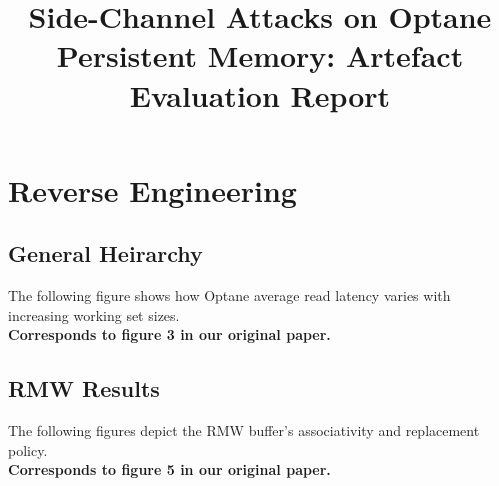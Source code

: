 \documentclass[letterpaper,twocolumn,10pt]{article}
\begin{document}
\title{Side-Channel Attacks on Optane Persistent Memory: Artefact Evaluation Report}

\maketitle

\newcommand{\corresponds}[1]{\textbf{\\Corresponds to #1  in our original paper.}}

\section{Reverse Engineering}
\subsection{General Heirarchy}
The following figure shows how Optane average read latency varies with increasing working set sizes.
\corresponds{figure 3}
\begin{figure}[H]
\centering
{}
\label{fig:general_hierarchy}
\vspace{-0.2cm}
\end{figure}

\subsection{RMW Results}
The following figures depict the RMW buffer's associativity and replacement policy.
\corresponds{figure 5}
\begin{figure}[H]
\centering
\begin{subfigure}[b]{0.49\hsize}

\end{subfigure}
\begin{subfigure}[b]{0.49\hsize}

\end{subfigure}
\label{fig:rmw_reverse}
\end{figure}

%
\end{document}
